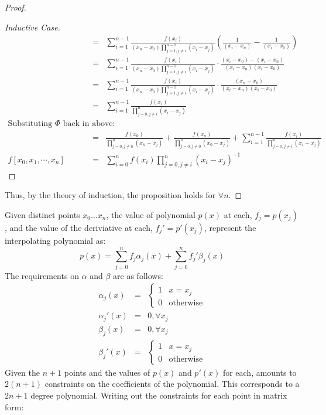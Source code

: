 \documentclass{article}
\newcommand{\ea}[1]{\begin{eqnarray*}#1\end{eqnarray*}}
\newcommand{\leftbrace}[1]{\left\{\begin{array}{ll}#1 \end{array}\right.}
\begin{document}
\begin{proof}
\begin{proof}[Inductive Case]
\begin{eqnarray*}
			&=& \sum_{i=1}^{n-1} \frac{f(x_i)}{ (x_n-x_0) \prod_{j=1,j\neq i}^{n-1} (x_i - x_j)}
				\left( \frac{1}{ (x_i - x_n) } - \frac{1}{ (x_i - x_0) } \right)\\
			&=& \sum_{i=1}^{n-1} \frac{f(x_i)}{ (x_n-x_0) \prod_{j=1,j\neq i}^{n-1} (x_i - x_j)}
				\cdot \frac{(x_i - x_0) - (x_i - x_n)}{ (x_i - x_n)(x_i - x_0) } \\
			&=& \sum_{i=1}^{n-1} \frac{f(x_i)}{ (x_n-x_0) \prod_{j=1,j\neq i}^{n-1} (x_i - x_j)}
				\cdot \frac{(x_n - x_0)}{ (x_i - x_n)(x_i - x_0) } \\
			&=& \sum_{i=1}^{n-1} \frac{f(x_i)}{ \prod_{j=0,j\neq i}^{n} (x_i - x_j)} \\
		\textrm{Substituting $\Phi$ back in above:}\\
		&=& \frac{f(x_0)}{\prod_{j=0,j\neq n}^{n} (x_n - x_j)} + 
		            \frac{f(x_n)}{\prod_{j=0,j\neq 0}^{n} (x_0 - x_j)} +
					\sum_{i=1}^{n-1} \frac{f(x_i)}{ \prod_{j=0,j\neq i}^{n} (x_i - x_j)} \\
		f[x_0,x_1,\cdots,x_n] &=& \sum_{i=0}^{n} f(x_i) \prod_{j=0,j\neq i}^{n} (x_i - x_j)^{-1}
	\end{eqnarray*}
\end{proof}
Thus, by the theory of induction, the proposition holds for $\forall n$.
\end{proof}
 Given distinct points $x_0 \dots x_n$, the value of polynomial 
$p(x)$ at each, $f_j=p(x_j)$, and the value of the deriviative at each, 
$f_j'=p'(x_j)$, represent the interpolating polynomial as:
\[
	p(x) = \sum_{j=0}^n f_j\alpha_j(x) + \sum_{j=0}^n f_j'\beta_j(x)
\]
The requirements on $\alpha$ and $\beta$ are as follows:\\
\ea{
	\alpha_j(x) &=& \leftbrace{ 1 & x=x_j \\
	                         0 & \textrm{otherwise}
							} \\
	\alpha_j'(x) &=& 0, \forall x_j \\
	\beta_j(x) &=& 0, \forall x_j \\
	\beta_j'(x) &=& \leftbrace{ 1 & x=x_j \\
	                            0 & \textrm{otherwise}
							}
}
 Given the $n+1$ points and the values of $p(x)$ and $p'(x)$ for each, amounts to
$2(n+1)$ constraints on the coefficients of the polynomial. This corresponds to a $2n+1$ degree
polynomial. Writing out the constraints for each point in matrix form:
\end{document}
